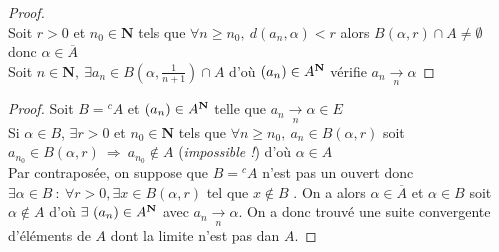 		\begin{proof} ~\\
		\fbox{$\Leftarrow$} Soit $r>0$ et $n_0\in\mathbf{N}$ tels que $\forall n\geq n_0 ,~d(a_n,\alpha ) <r$ 
		alors $B(\alpha , r) \cap A \neq \emptyset$ donc $\alpha \in \overline{A}$ \\ 
		\fbox{$\Rightarrow$} Soit $n\in \mathbf{N} , ~\exists a_n \in B(\alpha, \frac{1}{n+1} ) \cap A$ d'où $(a_n) \in A^{\mathbf{N}}$ 
		vérifie $a_n \underset{n}{\to} \alpha$	
		\end{proof} \medskip
		
		
		\begin{proof}
		\fbox{$\Rightarrow$} Soit $B={^cA}$ et $(a_n) \in A^{\mathbf{N}}$ telle que $a_n \underset{n}{\to} \alpha\in E$ \\
		Si $\alpha \in B$, $\exists r>0$ et $n_0\in\mathbf{N}$ tels que $\forall n\geq n_0 ,~a_n\in B(\alpha ,r)$ soit $a_{n_0} \in B(\alpha ,r)~
		\Rightarrow ~a_{n_0}\notin A$ (\emph{impossible !}) d'où $\alpha\in A$\\
		\fbox{$\Leftarrow$} Par contraposée, on suppose que $B={^cA} $ n'est pas un ouvert donc $\exists \alpha \in B ~:~ 
		\forall r>0, 
		 \exists x\in B(\alpha,r)$ tel que $x\notin B$ . On a alors $\alpha\in\overline{A}$ et $\alpha\in B$ soit $\alpha \notin A$
		d'où $\exists~(a_n) \in A^{\mathbf{N}}$ avec $a_n \underset{n}{\to} \alpha$. On a donc trouvé une suite convergente d'éléments de $A$ 
		dont la limite n'est pas dan $A$.
		\end{proof} \medskip
		
		 \medskip
		
		\label{2.1.5} \medskip
		
		 \medskip
		
		 \medskip
		
